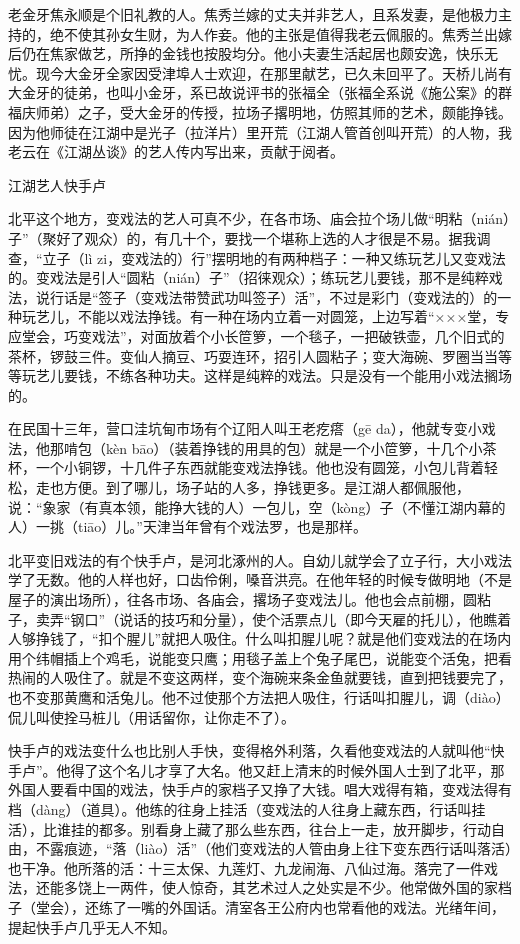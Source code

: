 \documentclass[12pt,UTF8]{ctexbook}
\begin{document}
老金牙焦永顺是个旧礼教的人。焦秀兰嫁的丈夫并非艺人，且系发妻，是他极力主持的，绝不使其孙女生财，为人作妾。他的主张是值得我老云佩服的。焦秀兰出嫁后仍在焦家做艺，所挣的金钱也按股均分。他小夫妻生活起居也颇安逸，快乐无忧。现今大金牙全家因受津埠人士欢迎，在那里献艺，已久未回平了。天桥儿尚有大金牙的徒弟，也叫小金牙，系已故说评书的张福全（张福全系说《施公案》的群福庆师弟）之子，受大金牙的传授，拉场子撂明地，仿照其师的艺术，颇能挣钱。因为他师徒在江湖中是光子（拉洋片）里开荒（江湖人管首创叫开荒）的人物，我老云在《江湖丛谈》的艺人传内写出来，贡献于阅者。





江湖艺人快手卢


北平这个地方，变戏法的艺人可真不少，在各市场、庙会拉个场儿做“明粘（nián）子”（聚好了观众）的，有几十个，要找一个堪称上选的人才很是不易。据我调查，“立子（lì zi，变戏法的）行”摆明地的有两种档子：一种又练玩艺儿又变戏法的。变戏法是引人“圆粘（nián）子”（招徕观众）；练玩艺儿要钱，那不是纯粹戏法，说行话是“签子（变戏法带赞武功叫签子）活”，不过是彩门（变戏法的）的一种玩艺儿，不能以戏法挣钱。有一种在场内立着一对圆笼，上边写着“×××堂，专应堂会，巧变戏法”，对面放着个小长笸箩，一个毯子，一把破铁壶，几个旧式的茶杯，锣鼓三件。变仙人摘豆、巧耍连环，招引人圆粘子；变大海碗、罗圈当当等等玩艺儿要钱，不练各种功夫。这样是纯粹的戏法。只是没有一个能用小戏法搁场的。

在民国十三年，营口洼坑甸市场有个辽阳人叫王老疙瘩（gē da），他就专变小戏法，他那啃包（kèn bāo）（装着挣钱的用具的包）就是一个小笸箩，十几个小茶杯，一个小铜锣，十几件子东西就能变戏法挣钱。他也没有圆笼，小包儿背着轻松，走也方便。到了哪儿，场子站的人多，挣钱更多。是江湖人都佩服他，说：“象家（有真本领，能挣大钱的人）一包儿，空（kòng）子（不懂江湖内幕的人）一挑（tiāo）儿。”天津当年曾有个戏法罗，也是那样。

北平变旧戏法的有个快手卢，是河北涿州的人。自幼儿就学会了立子行，大小戏法学了无数。他的人样也好，口齿伶俐，嗓音洪亮。在他年轻的时候专做明地（不是屋子的演出场所），往各市场、各庙会，撂场子变戏法儿。他也会点前棚，圆粘子，卖弄“钢口”（说话的技巧和分量），使个活票点儿（即今天雇的托儿），他瞧着人够挣钱了，“扣个腥儿”就把人吸住。什么叫扣腥儿呢？就是他们变戏法的在场内用个纬帽插上个鸡毛，说能变只鹰；用毯子盖上个兔子尾巴，说能变个活兔，把看热闹的人吸住了。就是不变这两样，变个海碗来条金鱼就要钱，直到把钱要完了，也不变那黄鹰和活兔儿。他不过使那个方法把人吸住，行话叫扣腥儿，调（diào）侃儿叫使拴马桩儿（用话留你，让你走不了）。

快手卢的戏法变什么也比别人手快，变得格外利落，久看他变戏法的人就叫他“快手卢”。他得了这个名儿才享了大名。他又赶上清末的时候外国人士到了北平，那外国人要看中国的戏法，快手卢的家档子又挣了大钱。唱大戏得有箱，变戏法得有档（dàng）（道具）。他练的往身上挂活（变戏法的人往身上藏东西，行话叫挂活），比谁挂的都多。别看身上藏了那么些东西，往台上一走，放开脚步，行动自由，不露痕迹，“落（liào）活”（他们变戏法的人管由身上往下变东西行话叫落活）也干净。他所落的活：十三太保、九莲灯、九龙闹海、八仙过海。落完了一件戏法，还能多饶上一两件，使人惊奇，其艺术过人之处实是不少。他常做外国的家档子（堂会），还练了一嘴的外国话。清室各王公府内也常看他的戏法。光绪年间，提起快手卢几乎无人不知。
\end{document}
